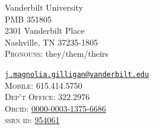 \noindent
\parbox[t]{0.45\textwidth}{%
Vanderbilt University\\
PMB 351805\\
2301 Vanderbilt Place\\
Nashville, TN 37235-1805\\
\textsc{Pronouns:} they/them/theirs
}
\parbox[t]{0.5\textwidth}{\raggedleft
	{%
    \href{mailto:jmagnolia.gilligan@vanderbilt.edu}{\nolinkurl{j.magnolia.gilligan@vanderbilt.edu}}%
	}\\
    \textsc{Mobile:} 615.414.5750\\
    \textsc{Dep't Office:} 322.2976\\
    \textsc{Orcid:} \href{https://orcid.org/0000-0003-1375-6686}{0000-0003-1375-6686}\\
    \textsc{ssrn id:} \href{https://papers.ssrn.com/sol3/cf_dev/AbsByAuth.cfm?per_id=954061}{954061}\\
    \qquad{}
}
